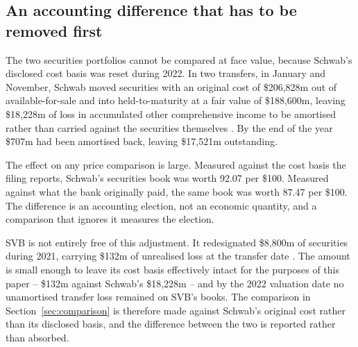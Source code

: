 \subsection{An accounting difference that has to be removed first}

The two securities portfolios cannot be compared at face value, because Schwab's
disclosed cost basis was reset during 2022. In two transfers, in January and
November, Schwab moved securities with an original cost of \$206,828m out of
available-for-sale and into held-to-maturity at a fair value of \$188,600m,
leaving \$18,228m of loss in accumulated other comprehensive income to be
amortised rather than carried against the securities themselves
\citep{Schwab10K2022}. By the end of the year \$707m had been amortised back,
leaving \$17,521m outstanding.

The effect on any price comparison is large. Measured against the cost basis the
filing reports, Schwab's securities book was worth 92.07 per \$100. Measured
against what the bank originally paid, the same book was worth 87.47 per \$100.
The difference is an accounting election, not an economic quantity, and a
comparison that ignores it measures the election.

SVB is not entirely free of this adjustment. It redesignated \$8,800m of
securities during 2021, carrying \$132m of unrealised loss at the transfer date
\citep{SVB10K2021}. The amount is small enough to leave its cost basis
effectively intact for the purposes of this paper -- \$132m against Schwab's
\$18,228m -- and by the 2022 valuation date no unamortised transfer loss remained
on SVB's books. The comparison in Section~\ref{sec:comparison} is therefore made
against Schwab's original cost rather than its disclosed basis, and the
difference between the two is reported rather than absorbed.
